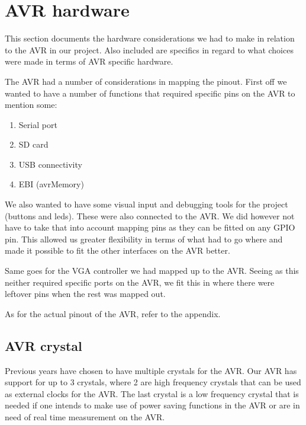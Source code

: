 \section{AVR hardware}

This section documents the hardware considerations we had to make in relation to
the AVR in our project. Also included are specifics in regard to what choices
were made in terms of AVR specific hardware.

The AVR had a number of considerations in mapping the pinout. First off we
wanted to have a number of functions that required specific pins on the AVR to
mention some:

\begin{enumerate}
\item Serial port
\item \ac{SD} card
\item \ac{USB} connectivity
\item \ac{EBI} (avrMemory)
\end{enumerate}

We also wanted to have some visual input and debugging tools for the project
(buttons and leds). These were also connected to the AVR. We did however not
have to take that into account mapping pins as they can be fitted on any
\ac{GPIO} pin. This allowed us greater flexibility in terms of what had to go
where and made it possible to fit the other interfaces on the AVR better.

Same goes for the \ac{VGA} controller we had mapped up to the \ac{AVR}. Seeing
as this neither required specific ports on the \ac{AVR}, we fit this in where
there were leftover pins when the rest was mapped out.

As for the actual pinout of the \ac{AVR}, refer to the appendix.

\subsection{AVR crystal}

Previous years have chosen to have multiple crystals for the AVR. Our AVR has support for up to 3 crystals, where 2 are high frequency crystals that can be used as external clocks for the AVR. The last crystal is a low frequency crystal that is needed if one intends to make use of power saving functions in the AVR or are in need of real time measurement on the AVR. 

